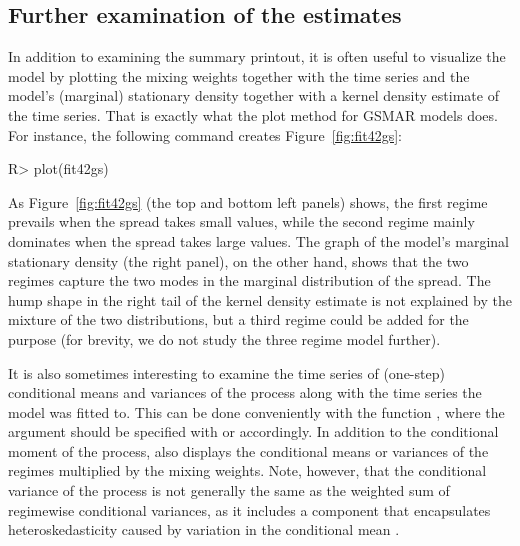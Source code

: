 \documentclass[nojss]{jss} %
\begin{document}
\subsection{Further examination of the estimates}\label{sec:examestim}
In addition to examining the summary printout, it is often useful to visualize the model by plotting the mixing weights together with the time series and the model's (marginal) stationary density together with a kernel density estimate of the time series. That is exactly what the plot method for GSMAR models does. For instance, the following command creates Figure~\ref{fig:fit42gs}:
%
\begin{CodeChunk}
\begin{CodeInput}
R> plot(fit42gs)
\end{CodeInput}
\end{CodeChunk}
%
As Figure~\ref{fig:fit42gs} (the top and bottom left panels) shows, the first regime prevails when the spread takes small values, while the second regime mainly dominates when the spread takes large values. The graph of the model's marginal stationary density (the right panel), on the other hand, shows that the two regimes capture the two modes in the marginal distribution of the spread. The hump shape in the right tail of the kernel density estimate is not explained by the mixture of the two distributions, but a third regime could be added for the purpose (for brevity, we do not study the three regime model further).

It is also sometimes interesting to examine the time series of (one-step) conditional means and variances of the process along with the time series the model was fitted to. This can be done conveniently with the function , where the argument  should be specified with  or  accordingly. In addition to the conditional moment of the process,  also displays the conditional means or variances of the regimes multiplied by the mixing weights. Note, however, that the conditional variance of the process is not generally the same as the weighted sum of regimewise conditional variances, as it includes a component that encapsulates heteroskedasticity caused by variation in the conditional mean \cite[see][Equation (2.19)]{Virolainen:2020}.
\end{document}
